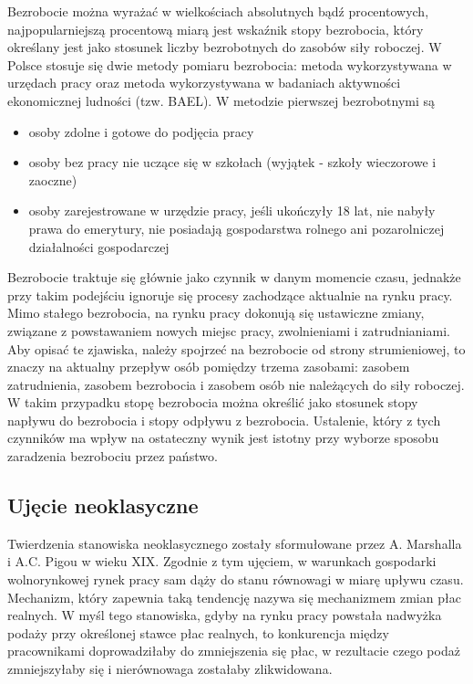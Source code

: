 \documentclass[12pt]{extarticle}
\begin{document}
Bezrobocie można wyrażać w wielkościach absolutnych bądź procentowych, najpopularniejszą procentową miarą jest wskaźnik stopy bezrobocia, który określany jest jako stosunek liczby bezrobotnych do zasobów siły roboczej. W Polsce stosuje się dwie metody pomiaru bezrobocia: metoda wykorzystywana w urzędach pracy oraz metoda wykorzystywana w badaniach aktywności ekonomicznej ludności (tzw. BAEL). W metodzie pierwszej bezrobotnymi są

\begin{itemize}
	\item osoby zdolne i gotowe do podjęcia pracy
    \item osoby bez pracy nie uczące się w szkołach (wyjątek - szkoły wieczorowe i zaoczne)
	\item osoby zarejestrowane w urzędzie pracy, jeśli ukończyły 18 lat, nie nabyły prawa do emerytury, nie posiadają gospodarstwa rolnego ani pozarolniczej działalności gospodarczej
\end{itemize}

Bezrobocie traktuje się głównie jako czynnik w danym momencie czasu, jednakże przy takim podejściu ignoruje się procesy zachodzące aktualnie na rynku pracy. Mimo stałego bezrobocia, na rynku pracy dokonują się ustawiczne zmiany, związane z powstawaniem nowych miejsc pracy, zwolnieniami i zatrudnianiami. Aby opisać te zjawiska, należy spojrzeć na bezrobocie od strony strumieniowej, to znaczy na aktualny przepływ osób pomiędzy trzema zasobami: zasobem zatrudnienia, zasobem bezrobocia i zasobem osób nie należących do siły roboczej. W takim przypadku stopę bezrobocia można określić jako stosunek stopy napływu do bezrobocia i stopy odpływu z bezrobocia. Ustalenie, który z tych czynników ma wpływ na ostateczny wynik jest istotny przy wyborze sposobu zaradzenia bezrobociu przez państwo.

\subsection{Ujęcie neoklasyczne}

Twierdzenia stanowiska neoklasycznego zostały sformułowane przez A. Marshalla i A.C. Pigou w wieku XIX. Zgodnie z tym ujęciem, w warunkach gospodarki wolnorynkowej rynek pracy sam dąży do stanu równowagi w miarę upływu czasu. Mechanizm, który zapewnia taką tendencję nazywa się mechanizmem zmian płac realnych. W myśl tego stanowiska, gdyby na rynku pracy powstała nadwyżka podaży przy określonej stawce płac realnych, to konkurencja między pracownikami doprowadziłaby do zmniejszenia się płac, w rezultacie czego podaż zmniejszyłaby się i nierównowaga zostałaby zlikwidowana.
\end{document}
